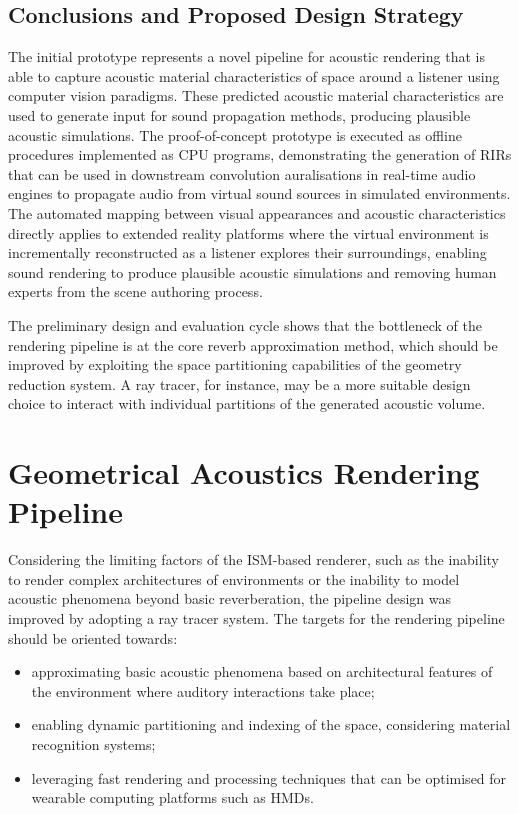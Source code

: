 \subsection{Conclusions and Proposed Design Strategy}
The initial prototype represents a novel pipeline for acoustic rendering that is able to capture acoustic material characteristics of space around a listener using computer vision paradigms. These predicted acoustic material characteristics are used to generate input for sound propagation methods, producing plausible acoustic simulations. The proof-of-concept prototype is executed as offline procedures implemented as CPU programs, demonstrating the generation of RIRs that can be used in downstream convolution auralisations in real-time audio engines to propagate audio from virtual sound sources in simulated environments. The automated mapping between visual appearances and acoustic characteristics directly applies to extended reality platforms where the virtual environment is incrementally reconstructed as a listener explores their surroundings, enabling sound rendering to produce plausible acoustic simulations and removing human experts from the scene authoring process. \par
The preliminary design and evaluation cycle shows that the bottleneck of the rendering pipeline is at the core reverb approximation method, which should be improved by exploiting the space partitioning capabilities of the geometry reduction system. A ray tracer, for instance, may be a more suitable design choice to interact with individual partitions of the generated acoustic volume. \par

\section{Geometrical Acoustics Rendering Pipeline}
\label{sec:ga-based-pipeline}
Considering the limiting factors of the ISM-based renderer, such as the inability to render complex architectures of environments or the inability to model acoustic phenomena beyond basic reverberation, the pipeline design was improved by adopting a ray tracer system. The targets for the rendering pipeline should be oriented towards: 
\begin{itemize}
    \item approximating basic acoustic phenomena based on architectural features of the environment where auditory interactions take place;
    \item enabling dynamic partitioning and indexing of the space, considering material recognition systems; 
    \item leveraging fast rendering and processing techniques that can be optimised for wearable computing platforms such as HMDs.
\end{itemize}



